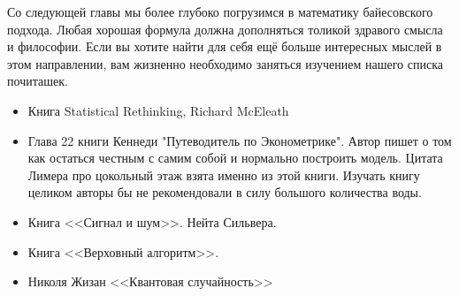 Со следующей главы мы более глубоко погрузимся в математику байесовского подхода. Любая хорошая формула должна дополняться толикой здравого смысла и философии. Если вы хотите найти для себя ещё больше интересных мыслей в этом направлении, вам жизненно необходимо заняться изучением нашего списка почиташек.


\begin{itemize}

\item   Книга Statistical Rethinking, Richard McEleath

\item  Глава 22 книги Кеннеди "Путеводитель по Эконометрике". Автор пишет о том как остаться честным с самим собой и нормально построить модель. Цитата Лимера про цокольный этаж взята именно из этой книги. Изучать книгу целиком авторы бы не рекомендовали в силу большого количества воды. 

\item Книга <<Сигнал и шум>>. Нейта Сильвера. 

\item Книга <<Верховный алгоритм>>. 

\item  Николя Жизан <<Квантовая случайность>> 
\end{itemize}
